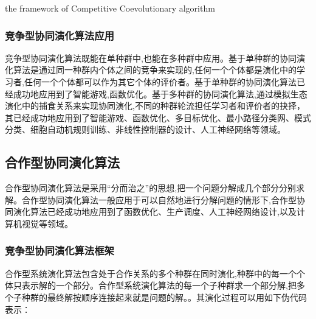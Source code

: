 \documentclass[a4paper]{article}
\begin{document}
    \begin{algorithm}[H]
        
        \caption{the framework of Competitive Coevolutionary algorithm}
        \label{alg1}
        \onehalfspacing

        \begin{algorithmic}[1]
            \EndWhile
        \end{algorithmic}

    \end{algorithm}

    \subsubsection{竞争型协同演化算法应用}

    竞争型协同演化算法既能在单种群中,也能在多种群中应用。基于单种群的协同演化算法是通过同一种群内个体之间的竞争来实现的,任何一个个体都是演化中的学习者,任何一个个体都可以作为其它个体的评价者。基于单种群的协同演化算法已经成功地应用到了智能游戏,函数优化。基于多种群的协同演化算法,通过模拟生态演化中的捕食关系来实现协同演化,不同的种群轮流担任学习者和评价者的抉择，其已经成功地应用到了智能游戏、函数优化、多目标优化、最小路径分类网、模式分类、细胞自动机规则训练、非线性控制器的设计、人工神经网络等领域。

    \subsection{合作型协同演化算法}

    合作型协同演化算法是采用“分而治之”的思想,把一个问题分解成几个部分分别求解。合作型协同演化算法一般应用于可以自然地进行分解问题的情形下,合作型协同演化算法已经成功地应用到了函数优化、生产调度、人工神经网络设计,以及计算机视觉等领域。

    \subsubsection{竞争型协同演化算法框架}
    合作型系统演化算法包含处于合作关系的多个种群在同时演化,种群中的每一个个体只表示解的一个部分。合作型系统演化算法的每一个子种群求一个部分解,把多个子种群的最终解按顺序连接起来就是问题的解。。其演化过程可以用如下伪代码表示：
\end{document}
